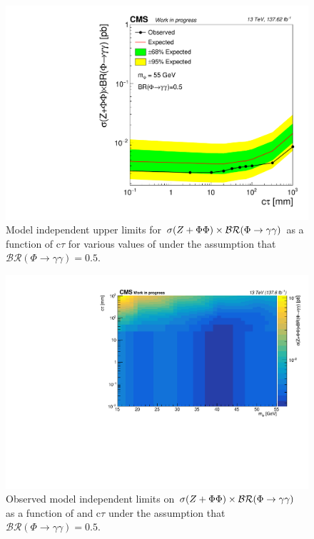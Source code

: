\begin{figure}[H]
	\includegraphics[width=0.4\linewidth]{figs/05_analysis/limitVsCtau_ZH_m55_Run2_modelIndependent.pdf}
	\caption[Model independent upper limits for $\sigma(\VZ+\Phi\Phi)\times\mathcal{BR}(\Phi\to\gamma\gamma)$ as a function of c$\tau$ for various values of \mphi under the assumption that $\mathcal{BR} (\Phi \to \gamma\gamma) =0.5$.]{Model independent upper limits for $\sigma(\VZ+\Phi\Phi)\times\mathcal{BR}(\Phi\to\gamma\gamma)$ as a function of c$\tau$ for various values of \mphi under the assumption that $\mathcal{BR} (\Phi \to \gamma\gamma) =0.5$.}
	\label{fig:limits_MIndep_1D}
\end{figure}

\begin{figure}[htb!]
	\centering
	\includegraphics[width=0.75\linewidth]{figs/05_analysis/obs_2D_ZH_mVsCtau_Run2_modelIndependent.pdf}
	\caption[Observed model independent limits on $\sigma(\VZ+\Phi\Phi)\times\mathcal{BR}(\Phi\to\gamma\gamma)$ as a function of \mphi and c$\tau$ under the assumption that $\mathcal{BR} (\Phi \to \gamma\gamma) =0.5$.]{Observed model independent limits on $\sigma(\VZ+\Phi\Phi)\times\mathcal{BR}(\Phi\to\gamma\gamma)$ as a function of \mphi and c$\tau$ under the assumption that $\mathcal{BR} (\Phi \to \gamma\gamma) =0.5$.}
	\label{fig:limits_MIndep_2D}
\end{figure}

